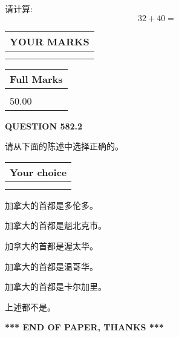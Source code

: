 \documentclass{ctexart}
\begin{document}
  
 
请计算:
\begin{equation}
32 +  %
40 = \nonumber
\end{equation}
 

 

 
  
\vspace{0.2in}
  
\noindent\begin{tabular}{|l|}
\hline
 YOUR MARKS  \\
\hline
 \\ 
 \\ 
\hline
\end{tabular}
\hspace{0.05in} \begin{tabular}{|l|}
\hline
 Full Marks  \\
\hline
 \\ 
50.00 \\
\hline
\end{tabular}
{\textbf{\Large{QUESTION
582.2 
}}}
  
  
请从下面的陈述中选择正确的。
  
  
\noindent\hspace{3.0in} \begin{tabular}{|l|}
\hline
Your choice \\
\hline
 \\ 
 \\ 
\hline
\end{tabular}
  
  
 
 
加拿大的首都是多伦多。
 
 
加拿大的首都是魁北克市。
 
 
加拿大的首都是渥太华。
 
 
加拿大的首都是温哥华。
 
 
加拿大的首都是卡尔加里。
 
 
 上述都不是。
 
 
   
   
 \vspace{0.2in}
 
   
   
   
   
\vspace{1.0in} 
{\textbf{\large{ *** END OF PAPER, THANKS *** }}} 
   
\end{document}
